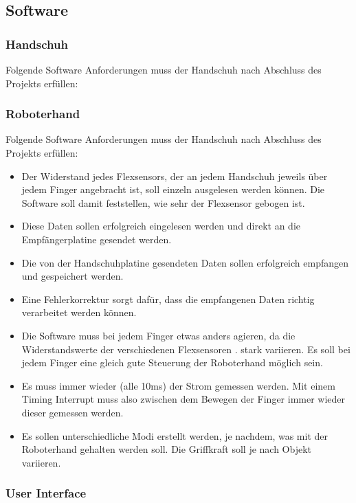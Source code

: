 \documentclass[11pt]{article}
\begin{document}
\subsection{Software}
\subsubsection{Handschuh}
Folgende Software Anforderungen muss der Handschuh nach Abschluss des Projekts erfüllen:

\subsubsection{Roboterhand}
Folgende Software Anforderungen muss der Handschuh nach Abschluss des Projekts erfüllen:

	\begin{itemize}
		\item Der Widerstand jedes Flexsensors, der an jedem Handschuh jeweils über jedem Finger angebracht ist, 
			  soll einzeln ausgelesen werden können. Die Software soll damit feststellen, wie sehr der Flexsensor 
			  gebogen ist.
		\item Diese Daten sollen erfolgreich eingelesen werden und direkt an die Empfängerplatine gesendet werden.
		\item Die von der Handschuhplatine gesendeten Daten sollen erfolgreich empfangen und gespeichert werden.
		\item Eine Fehlerkorrektur sorgt dafür, dass die empfangenen Daten richtig verarbeitet werden können.
		\item Die Software muss bei jedem Finger etwas anders agieren, da die Widerstandswerte der verschiedenen 
		      Flexsensoren .
			  stark variieren. Es soll bei jedem Finger eine gleich gute Steuerung der Roboterhand möglich sein.
		\item Es muss immer wieder (alle 10ms) der Strom gemessen werden. Mit einem Timing Interrupt muss also zwischen 
		      dem Bewegen der Finger immer wieder dieser gemessen werden.
		\item Es sollen unterschiedliche Modi erstellt werden, je nachdem, was mit der Roboterhand gehalten werden soll. 
			  Die Griffkraft soll je nach Objekt variieren.
	\end{itemize}

\subsubsection{User Interface}
\end{document}
